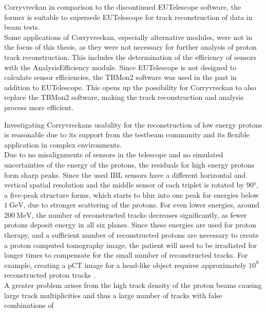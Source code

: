 Corryvreckan in comparison to the discontinued EUTelescope software, the former is suitable to supersede EUTelescope for track reconstruction of data in beam tests. \\
Some applications of Corryvreckan, especially alternative modules, were not in the focus of this thesis,
as they were not necessary for further analysis of proton track reconstruction. This includes the determination of the
efficiency of sensors with the AnalysisEfficiency module. Since EUTelescope is not designed to calculate sensor efficiencies,
the TBMon2 software was used in the past in addition
to EUTelescope. This opens up the possibility for Corryvreckan to also replace the TBMon2 software, making the track reconstruction and analysis process more efficient.

Investigating Corryvreckans usability for the reconstruction of low energy protons is reasonable due to its support from the testbeam community and
its flexible application in complex environments. \\
Due to no misalignments of sensors in the telescope and no simulated uncertainties
of the energy of the protons, the residuals for high energy protons form sharp peaks. Since the used IBL sensors have a different
horizontal and vertical spatial resolution and the middle sensor of each triplet is rotated by 90°, a five-peak structure
forms, which starts to blur into one peak for energies below $\SI{1}{\giga\eV}$, due to stronger scattering of the protons. For even lower energies,
around $\SI{200}{\mega\eV}$, the number of reconstructed tracks decreases significantly, as fewer protons deposit energy in all six planes. Since these energies are
used for proton therapy, and a sufficient number of reconstructed protons are necessary to create a proton computed tomography image, the patient
will need to be irradiated for longer times to compensate for the small number of reconstructed tracks. For example, creating a pCT image for a head-like object requires approximately $10^9$ reconstructed proton tracks \cite{number_protons}. \\
A greater problem arises from the high track density of the proton beams causing large track multiplicities and thus a large number of tracks with false combinations of
